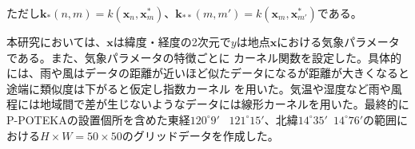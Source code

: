 ただし$\boldsymbol{k}_{*}(n, m) = k(\boldsymbol{x}_{n}, \boldsymbol{x}_{m}^*)$、$\boldsymbol{k}_{**}(m, m') = k(\boldsymbol{x}_{m}, \boldsymbol{x}_{m'}^*)$である。

本研究においては、$\boldsymbol{x}$は緯度・経度の2次元で$y$は地点$\boldsymbol{x}$における気象パラメータである。また、気象パラメータの特徴ごとに
カーネル関数を設定した。具体的には、雨や風はデータの距離が近いほど似たデータになるが距離が大きくなると途端に類似度は下がると仮定し指数カーネル
を用いた。気温や湿度など雨や風程には地域間で差が生じないようなデータには線形カーネルを用いた。最終的にP-POTEKAの設置個所を含めた東経$120^{\circ}9'$~
$121^{\circ}15'$、北緯$14^{\circ}35'$~$14^{\circ}76'$の範囲における$H \times W = 50 \times 50$のグリッドデータを作成した。
